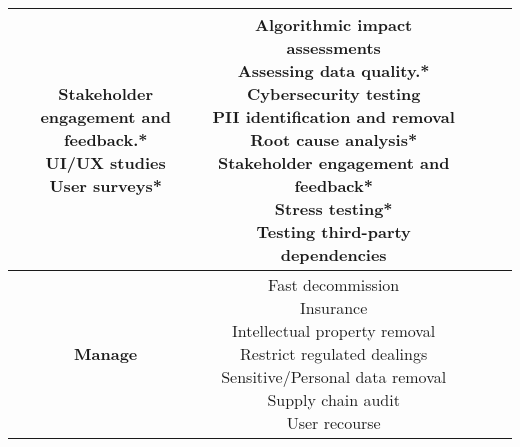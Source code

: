 \documentclass[fleqn]{article}
\begin{document}
\begin{landscape}
\begin{table}[H]
\begin{tabular}{|c|c|c|c|c|}
{			\textbullet\hspace{3pt} Stakeholder engagement and \\\hspace{10pt}feedback.*	\\		
			\textbullet\hspace{3pt} UI/UX studies \\			
			\textbullet\hspace{3pt} User surveys*\\  
		} 
		& 	
		\makecell[l]{
			\textbullet\hspace{3pt} Algorithmic impact assessments\\  	
			\textbullet\hspace{3pt} Assessing data quality.* \\
			\textbullet\hspace{3pt} Cybersecurity testing\\  
			\textbullet\hspace{3pt} PII identification and removal\\  		
			\textbullet\hspace{3pt} Root cause analysis*\\  	
			\textbullet\hspace{3pt} Stakeholder engagement and feedback*\\  	
			\textbullet\hspace{3pt} Stress testing*\\  	
			\textbullet\hspace{3pt} Testing third-party dependencies \\
		}
		\\
		\hline		
		\textbf{Manage} &  \makecell[l]{
			\textbullet\hspace{3pt} Fast decommission \\ 	
			\textbullet\hspace{3pt} Insurance \\ 	
			\textbullet\hspace{3pt} Intellectual property removal \\ 			
			\textbullet\hspace{3pt} Restrict regulated dealings \\ 	
			\textbullet\hspace{3pt} Sensitive/Personal data removal \\ 	
			\textbullet\hspace{3pt} Supply chain audit \\ 	
			\textbullet\hspace{3pt} User recourse \\ 		 	
}
\end{tabular}
\end{table}
\end{landscape}
\end{document}
